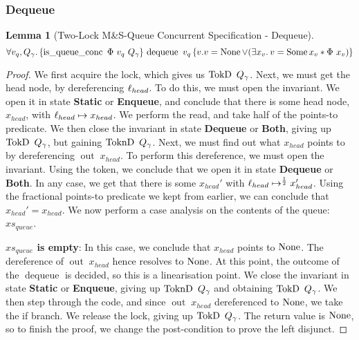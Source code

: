 \documentclass[a4paper, 11pt]{report}
\newtheorem{lemma}[theorem]{Lemma}
\newcommand{\dequeue}{\operatorname{dequeue}}
\newcommand{\tlmsq}{Two-Lock M\&S-Queue\xspace}
\newcommand{\isqueueconc}{\operatorname{is\_queue\_conc}}
\newcommand{\nOut}[1]{\operatorname{out} \; #1}
\newcommand{\StaticState}{\textbf{Static}}
\newcommand{\EnqueueState}{\textbf{Enqueue}}
\newcommand{\DequeueState}{\textbf{Dequeue}}
\newcommand{\BothState}{\textbf{Both}}
\newcommand{\Qg}{Q_\gname}
\newcommand{\TokD}[1]{\operatorname{TokD}\ #1}
\newcommand{\TokDQg}{\TokD{\Qg}}
\newcommand{\ToknD}[1]{\operatorname{ToknD}\ #1}
\newcommand{\ToknDQg}{\ToknD{\Qg}}
\newcommand{\tlconcspecdeq}{\All v_q, Q_\gname. \hoare{\isqueueconc \ \Phi \ v_q \ Q_\gname}{\dequeue\ v_q}{v . v = \None \lor (\Exists x_v. v = \Some x_v \star \Phi \ x_v)}}
\begin{document}
\subsubsection{Dequeue}
\begin{lemma}[\tlmsq Concurrent Specification - Dequeue]\label{TLMSQ:spec:conc:dequeue}
  \begin{equation*}
    \tlconcspecdeq
  \end{equation*}
\end{lemma}
\begin{proof}
We first acquire the lock, which gives us $\TokDQg$. Next, we must get the head node, by dereferencing $\ell_{head}$. To do this, we must open the invariant. We open it in state \StaticState{} or \EnqueueState{}, and conclude that there is some head node, $x_{head}$, with $\ell_{head} \mapsto x_{head}$. We perform the read, and take half of the points-to predicate. We then close the invariant in state \DequeueState{} or \BothState{}, giving up $\TokDQg$, but gaining $\ToknDQg$. Next, we must find out what $x_{head}$ points to by dereferencing $\nOut{x_{head}}$. To perform this dereference, we must open the invariant. Using the token, we conclude that we open it in state \DequeueState{} or \BothState{}. In any case, we get that there is some $x_{head}'$ with $\ell_{head} \mapsto^{\frac{1}{2}} x_{head}'$. Using the fractional points-to predicate we kept from earlier, we can conclude that $x_{head}' = x_{head}$. We now perform a case analysis on the contents of the queue: $xs_{queue}$.

\textbf{$xs_{queue}$ is empty}: In this case, we conclude that $x_{head}$ points to $\operatorname{None}$. The dereference of $\nOut{x_{head}}$ hence resolves to $\operatorname{None}$. At this point, the outcome of the $\dequeue$ is decided, so this is a linearisation point. We close the invariant in state \StaticState{} or \EnqueueState{}, giving up $\ToknDQg$ and obtaining $\TokDQg$. We then step through the code, and since $\nOut{x_{head}}$ dereferenced to $\operatorname{None}$, we take the if branch. We release the lock, giving up $\TokDQg$. The return value is $\operatorname{None}$, so to finish the proof, we change the post-condition to prove the left disjunct.


\end{proof}
\end{document}
